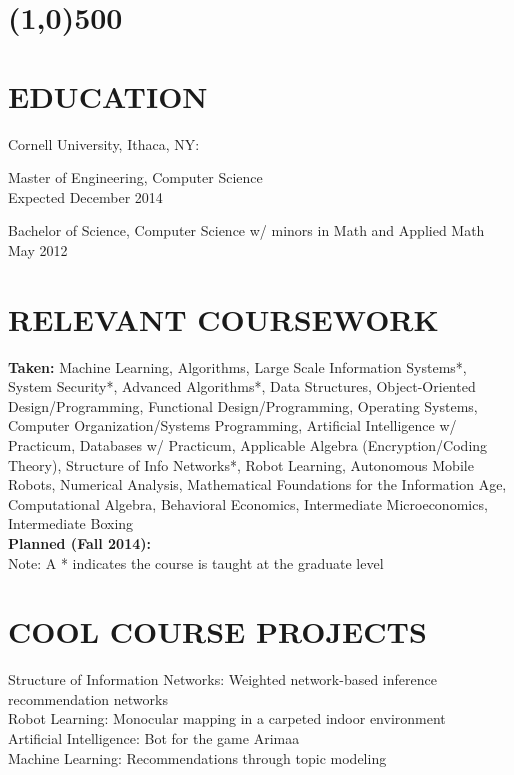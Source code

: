 \documentclass{res}
\begin{document}
 


\address{jasdeep.singh.hundal@gmail.com}
     
\begin{resume}
\vspace{-20pt}
\section{\line(1,0){500}}

\section{EDUCATION}
    Cornell University, Ithaca, NY:

    Master of Engineering, Computer Science \\
    Expected December 2014

    Bachelor of Science, Computer Science w/ minors in Math and Applied Math \\
    May 2012

\section{RELEVANT COURSEWORK}
    {\bf Taken:} Machine Learning, Algorithms, Large Scale Information Systems*, System Security*, Advanced Algorithms*, Data Structures, Object-Oriented Design/Programming, Functional Design/Programming, Operating Systems, Computer Organization/Systems Programming, Artificial Intelligence w/ Practicum, Databases w/ Practicum, Applicable Algebra (Encryption/Coding Theory), Structure of Info Networks*, Robot Learning, Autonomous Mobile Robots, Numerical Analysis, Mathematical Foundations for the Information Age, Computational Algebra, Behavioral Economics, Intermediate Microeconomics, Intermediate Boxing \\
    {\bf Planned (Fall 2014):}  \\
    {\footnotesize Note: A * indicates the course is taught at the graduate level}

\section{COOL COURSE PROJECTS}
   Structure of Information Networks: Weighted network-based inference recommendation networks  \\        
   Robot Learning: Monocular mapping in a carpeted indoor environment  \\
   Artificial Intelligence: Bot for the game Arimaa \\
   Machine Learning: Recommendations through topic modeling


\end{resume}
\end{document}

